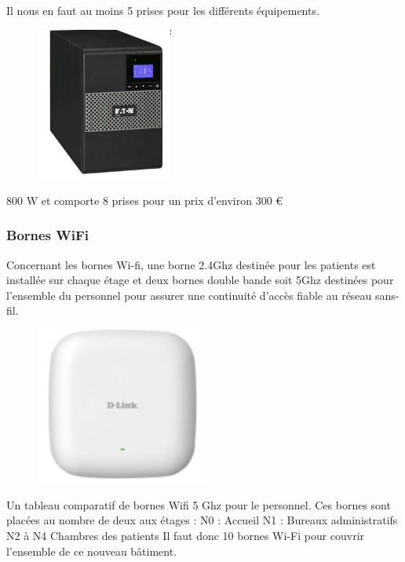 Il nous en faut au moins 5 prises pour les différents équipements.

\begin{figure}[!ht]
    \center
    \includegraphics[width=0.4\textwidth]{./images/18.png}
\end{figure}

800 W et comporte 8 prises pour un prix d'environ 300 \euro



\subsubsection{Bornes WiFi}

Concernant les bornes Wi-fi, une borne 2.4Ghz destinée pour les patients est installée sur chaque étage et deux bornes double bande soit 5Ghz destinées pour l'ensemble du personnel pour assurer une continuité d'accès fiable au réseau sans-fil.

\begin{figure}[!ht]
    \center
    \includegraphics[width=0.5\textwidth]{./images/20.png}
\end{figure}

Un tableau comparatif de bornes Wifi 5 Ghz pour le personnel. Ces bornes sont placées au nombre de deux aux étages :
N0 : Accueil
N1 : Bureaux administratifs
N2 à N4  Chambres des patients
Il faut donc 10 bornes Wi-Fi pour couvrir l'ensemble de ce nouveau bâtiment.



